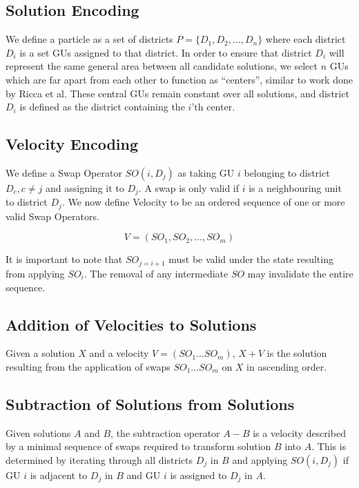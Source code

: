 \documentclass[journal]{IEEEtran}
\begin{document}
\subsection{Solution Encoding}
We define a particle as a set of districts $P = \{D_1, D_2, \dots, D_n\}$ where
each district $D_i$ is a set GUs assigned to that district.  In order to ensure
that district $D_i$ will represent the same general area between all candidate
solutions, we select $n$ GUs which are far apart from each other to function as
``centers'', similar to work done by Ricca et al\cite{voronoi}.  These central
GUs remain constant over all solutions, and district $D_i$ is defined as the
district containing the $i\text{'th}$ center.

\subsection{Velocity Encoding}
We define a Swap Operator $SO(i, D_j)$ as taking GU $i$ belonging to district
$D_c, c \neq j$ and assigning it to $D_j$.  A swap is only valid if $i$ is a
neighbouring unit to district $D_j$.  We now define Velocity to be an ordered
sequence of one or more valid Swap Operators.

\begin{equation}
\label{vel_encoding}
    V = (SO_1, SO_2, \dots, SO_m)
\end{equation}

It is important to note that $SO_{j = i + 1}$ must be valid under the state
resulting from applying $SO_i$.  The removal of any intermediate $SO$ may
invalidate the entire sequence.

\subsection{Addition of Velocities to Solutions}
Given a solution $X$ and a velocity $V = (SO_1 \dots SO_m)$, $X + V$ is the
solution resulting from the application of swaps $SO_1 \dots SO_m$ on $X$ in
ascending order.

\subsection{Subtraction of Solutions from Solutions}
Given solutions $A$ and $B$, the subtraction operator $A - B$ is a
velocity described by a minimal sequence of swaps required to transform solution
$B$ into $A$.  This is determined by iterating through all districts $D_{j}$ in
$B$ and applying $SO(i, D_j)$ if GU $i$ is adjacent to $D_j$ in $B$ and GU $i$ is
assigned to $D_j$ in $A$.
\end{document}
